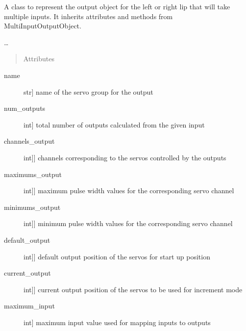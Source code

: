 \documentclass[letterpaper,10pt,english]{sphinxmanual}
\begin{document}
\begin{fulllineitems}
\label{\detokenize{specific:SideLipOutput.SideLipOutput}}
\sphinxAtStartPar
A class to represent the output object for the left or right lip that will take multiple inputs.
It inherits attributes and methods from MultiInputOutputObject.

\sphinxAtStartPar
…
\begin{quote}\begin{description}
\item[{Attributes}] \leavevmode
\end{description}\end{quote}
\begin{description}
\item[{name}] \leavevmode{[}str{]}
\sphinxAtStartPar
name of the servo group for the output

\item[{num\_outputs}] \leavevmode{[}int{]}
\sphinxAtStartPar
total number of outputs calculated from the given input

\item[{channels\_output}] \leavevmode{[}{[}int{]}{]}
\sphinxAtStartPar
channels corresponding to the servos controlled by the outputs

\item[{maximums\_output}] \leavevmode{[}{[}int{]}{]}
\sphinxAtStartPar
maximum pulse width values for the corresponding servo channel

\item[{minimums\_output}] \leavevmode{[}{[}int{]}{]}
\sphinxAtStartPar
minimum pulse width values for the corresponding servo channel

\item[{default\_output}] \leavevmode{[}{[}int{]}{]}
\sphinxAtStartPar
default output position of the servos for start up position

\item[{current\_output}] \leavevmode{[}{[}int{]}{]}
\sphinxAtStartPar
current output position of the servos to be used for increment mode

\item[{maximum\_input}] \leavevmode{[}int{]}
\sphinxAtStartPar
maximum input value used for mapping inputs to outputs


\end{description}
\end{fulllineitems}
\end{document}
